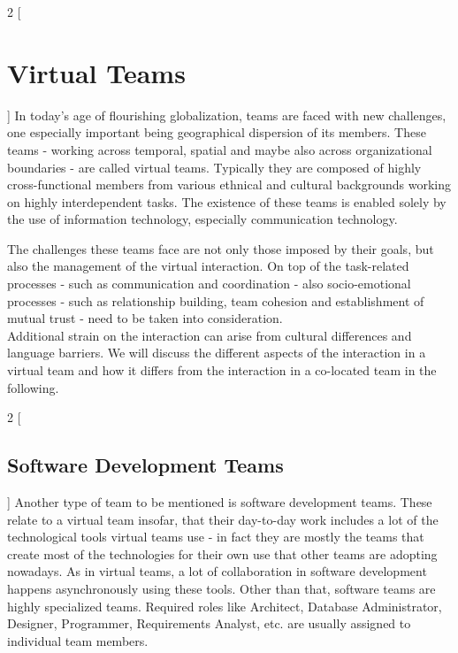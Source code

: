 \begin{multicols}{2}
[\section{Virtual Teams}]
In today's age of flourishing globalization, teams are faced with new challenges, one especially important being geographical dispersion of its members. These teams - working across temporal, spatial and maybe also across organizational boundaries - are called virtual teams. Typically they are composed of highly cross-functional members from various ethnical and cultural backgrounds working on highly interdependent tasks. The existence of these teams is enabled solely by the use of information technology, especially communication technology. 

The challenges these teams face are not only those imposed by their goals, but also the management of the virtual interaction. On top of the task-related processes - such as communication and coordination - also socio-emotional processes - such as relationship building, team cohesion and establishment of mutual trust - need to be taken into consideration.\cite{Powell_Piccoli_Ives_2004}\\ Additional strain on the interaction can arise from cultural differences and language barriers. We will discuss the different aspects of the interaction in a virtual team and how it differs from the interaction in a co-located team in the following.
\end{multicols}

\begin{multicols}{2}
[\subsection{Software Development Teams}]
Another type of team to be mentioned is software development teams. These relate to a virtual team insofar, that their day-to-day work includes a lot of the technological tools virtual teams use - in fact they are mostly the teams that create most of the technologies for their own use that other teams are adopting nowadays. As in virtual teams, a lot of collaboration in software development happens asynchronously using these tools. Other than that, software teams are highly specialized teams. Required roles like Architect, Database Administrator, Designer, Programmer, Requirements Analyst, etc. \cite{IBM} are usually assigned to individual team members. 
\end{multicols}